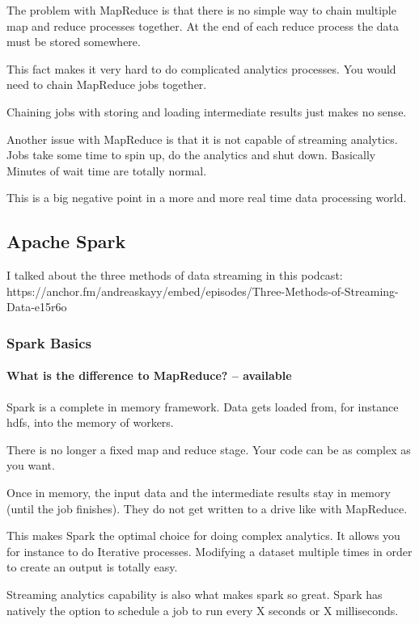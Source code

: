 \documentclass[12pt]{scrartcl} %
\begin{document}
The problem with MapReduce is that there is no simple way to chain multiple map and reduce processes together. At the end of each reduce process the data must be stored somewhere.

This fact makes it very hard to do complicated analytics processes. You would need to chain MapReduce jobs together.

Chaining jobs with storing and loading intermediate results just makes no sense.

Another issue with MapReduce is that it is not capable of streaming analytics. Jobs take some time to spin up, do the analytics and shut down. Basically Minutes of wait time are totally normal.

This is a big negative point in a more and more real time data processing world.



\subsection{Apache Spark}
I talked about the three methods of data streaming in this podcast: https://anchor.fm/andreaskayy/embed/episodes/Three-Methods-of-Streaming-Data-e15r6o

\subsubsection{Spark Basics}

\paragraph{What is the difference to MapReduce? -- available}
Spark is a complete in memory framework. Data gets loaded from, for instance hdfs, into the memory of workers.

There is no longer a fixed map and reduce stage. Your code can be as complex as you want.

Once in memory, the input data and the intermediate results stay in memory (until the job finishes). They do not get written to a drive like with MapReduce.

This makes Spark the optimal choice for doing complex analytics. It allows you for instance to do Iterative processes. Modifying a dataset multiple times in order to create an output is totally easy.

Streaming analytics capability is also what makes spark so great. Spark has natively the option to schedule a job to run every X seconds or X milliseconds.
\end{document}
